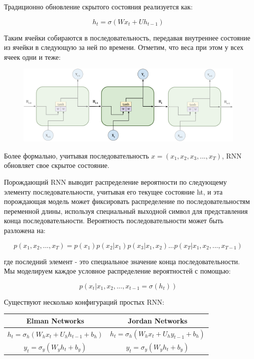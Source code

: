 \documentclass[a4paper,russian]{article}
\begin{document}
	Традиционно обновление скрытого состояния реализуется как:
	
	$$ h_t = \sigma(W x_t + U h_{t-1}) $$
	
	\clearpage
	
	Таким ячейки собираются в последовательность, передавая внутреннее состояние из ячейки в следующую за ней по времени. Отметим, что веса при этом у всех ячеек одни и теже:
	
	\begin{figure}[ht!]
		\centering
		\captionsetup{justification=centering}
		\includegraphics[width=165mm]{img/rnn_unfolded.png}
	\end{figure}
	
	Более формально, учитывая последовательность $x = (x_1, x_2, x_3, ... , x_T)$, RNN обновляет свое скрытое состояние. 
	
	Порождающий RNN выводит распределение вероятности по следующему элементу последовательности, учитывая его текущее состояние ht, и эта порождающая модель может фиксировать распределение по последовательностям переменной длины, используя специальный выходной символ для представления конца последовательности. Вероятность последовательности может быть разложена на:
	
	$$ p(x_1, x_2, ..., x_T) = p(x_1) p(x_2 | x_1) p(x_3 | x_1, x_2) ... p(x_T | x_1, x_2, ... , x_{T - 1}) $$
	
	где последний элемент - это специальное значение конца последовательности. Мы моделируем каждое условное
	распределение вероятностей с помощью:
	
	$$ p(x_t | x_1, x_2, ... , x_{t - 1} = \sigma(h_t)) $$
	
	Существуют несколько конфигураций простых RNN:
	
	\begin{table}[h]
			\centering
			\begin{tabular}{|c|c|} 
				\hline
				\textbf{Elman Networks} & \textbf{Jordan Networks}  \\ 
				\hline
				$	h_{t} = \sigma_{h}(W_h x_t + U_h h_{t - 1} + b_h) $ & 
				$	h_{t} = \sigma_{h}(W_h x_t + U_h y_{t - 1} + b_h) $  \\
				$	y_{t} = \sigma_{y}(W_y h_t + b_y) $ & 
				$	y_{t} = \sigma_{y}(W_y h_t + b_y) $ \\
				\hline
			\end{tabular}
	\end{table}
	
\end{document}
